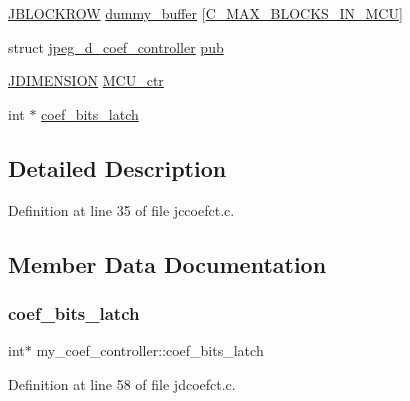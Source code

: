 \begin{DoxyCompactItemize}
\item 
\mbox{\hyperlink{jpeglib_8h_a04dea0959d9bd9e8ddad83597161453b}{J\+B\+L\+O\+C\+K\+R\+OW}} \mbox{\hyperlink{structmy__coef__controller_a5cffa07081b1c4361d9dfe48373c8240}{dummy\+\_\+buffer}} \mbox{[}\mbox{\hyperlink{jpeglib_8h_a4f270f4efb3fc0bb09f0d5ffa51ca327}{C\+\_\+\+M\+A\+X\+\_\+\+B\+L\+O\+C\+K\+S\+\_\+\+I\+N\+\_\+\+M\+CU}}\mbox{]}
\item 
struct \mbox{\hyperlink{structjpeg__d__coef__controller}{jpeg\+\_\+d\+\_\+coef\+\_\+controller}} \mbox{\hyperlink{structmy__coef__controller_a09524018020a2d7edbbcd92400f0919a}{pub}}
\item 
\mbox{\hyperlink{jmorecfg_8h_a04ed4674f6f1d0d50ec241531e38274f}{J\+D\+I\+M\+E\+N\+S\+I\+ON}} \mbox{\hyperlink{structmy__coef__controller_a17ccbcfc9a173194725050412855d7cf}{M\+C\+U\+\_\+ctr}}
\item 
int $\ast$ \mbox{\hyperlink{structmy__coef__controller_a04a1fed969821365fc54733467a120b9}{coef\+\_\+bits\+\_\+latch}}
\end{DoxyCompactItemize}


\subsection{Detailed Description}


Definition at line 35 of file jccoefct.\+c.



\subsection{Member Data Documentation}
\mbox{\label{structmy__coef__controller_a04a1fed969821365fc54733467a120b9}} 
\subsubsection{\texorpdfstring{coef\_bits\_latch}{coef\_bits\_latch}}
{\footnotesize\ttfamily int$\ast$ my\+\_\+coef\+\_\+controller\+::coef\+\_\+bits\+\_\+latch}



Definition at line 58 of file jdcoefct.\+c.

\mbox{\label{structmy__coef__controller_a5cffa07081b1c4361d9dfe48373c8240}} 
